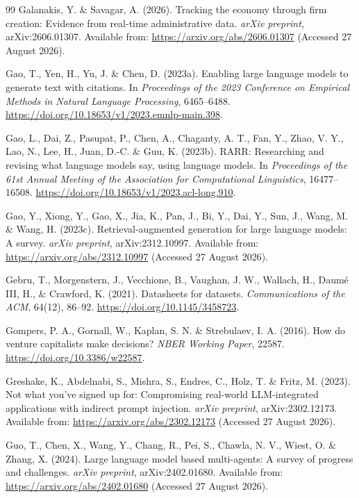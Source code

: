 \begin{thebibliography}{99}
Galanakis, Y. \& Savagar, A. (2026).
Tracking the economy through firm creation: Evidence from real-time administrative data.
\emph{arXiv preprint}, arXiv:2606.01307.
Available from: \url{https://arxiv.org/abs/2606.01307} (Accessed 27 August 2026).

Gao, T., Yen, H., Yu, J. \& Chen, D. (2023a).
Enabling large language models to generate text with citations.
In \emph{Proceedings of the 2023 Conference on Empirical Methods in Natural Language Processing},
6465--6488. \url{https://doi.org/10.18653/v1/2023.emnlp-main.398}.

Gao, L., Dai, Z., Pasupat, P., Chen, A., Chaganty, A. T., Fan, Y., Zhao, V. Y., Lao, N., Lee, H.,
Juan, D.-C. \& Guu, K. (2023b).
RARR: Researching and revising what language models say, using language models.
In \emph{Proceedings of the 61st Annual Meeting of the Association for Computational Linguistics},
16477--16508. \url{https://doi.org/10.18653/v1/2023.acl-long.910}.

Gao, Y., Xiong, Y., Gao, X., Jia, K., Pan, J., Bi, Y., Dai, Y., Sun, J., Wang, M. \& Wang, H.
(2023c).
Retrieval-augmented generation for large language models: A survey.
\emph{arXiv preprint}, arXiv:2312.10997.
Available from: \url{https://arxiv.org/abs/2312.10997} (Accessed 27 August 2026).

Gebru, T., Morgenstern, J., Vecchione, B., Vaughan, J. W., Wallach, H., Daum\'{e} III, H.,
\& Crawford, K. (2021).
Datasheets for datasets. \emph{Communications of the ACM}, 64(12), 86--92.
\url{https://doi.org/10.1145/3458723}.

Gompers, P. A., Gornall, W., Kaplan, S. N. \& Strebulaev, I. A. (2016).
How do venture capitalists make decisions?
\emph{NBER Working Paper}, 22587. \url{https://doi.org/10.3386/w22587}.

Greshake, K., Abdelnabi, S., Mishra, S., Endres, C., Holz, T. \& Fritz, M. (2023).
Not what you've signed up for: Compromising real-world LLM-integrated applications with indirect
prompt injection. \emph{arXiv preprint}, arXiv:2302.12173.
Available from: \url{https://arxiv.org/abs/2302.12173} (Accessed 27 August 2026).

Guo, T., Chen, X., Wang, Y., Chang, R., Pei, S., Chawla, N. V., Wiest, O. \& Zhang, X. (2024).
Large language model based multi-agents: A survey of progress and challenges.
\emph{arXiv preprint}, arXiv:2402.01680.
Available from: \url{https://arxiv.org/abs/2402.01680} (Accessed 27 August 2026).


\end{thebibliography}
